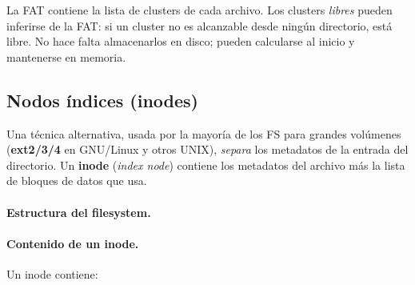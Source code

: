 \documentclass[11pt,a4paper]{article}
\begin{document}
\begin{idea}
La FAT contiene la lista de clusters de cada archivo. Los clusters
\emph{libres} pueden inferirse de la FAT: si un cluster no es
alcanzable desde ningún directorio, está libre. No hace falta
almacenarlos en disco; pueden calcularse al inicio y mantenerse en
memoria.
\end{idea}

\subsection{Nodos índices (inodes)}

Una técnica alternativa, usada por la mayoría de los FS para grandes
volúmenes (\textbf{ext2/3/4} en GNU/Linux y otros UNIX), \emph{separa}
los metadatos de la entrada del directorio. Un \textbf{inode}
(\emph{index node}) contiene los metadatos del archivo más la lista de
bloques de datos que usa.

\paragraph{Estructura del filesystem.}

\begin{center}
\end{center}

\paragraph{Contenido de un inode.}
Un inode contiene:
\end{document}
